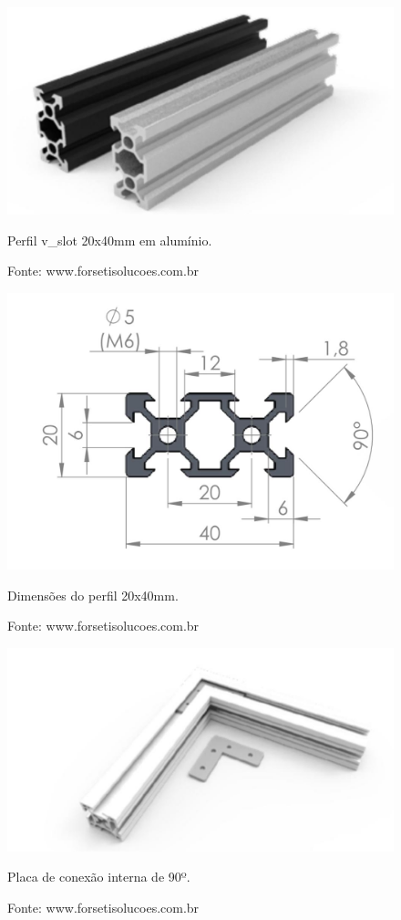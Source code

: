 \begin{figure}[!htb]
\centering
\includegraphics[scale = 0.4]{figuras/3-1}
\caption{Perfil v\_slot  20x40mm em alumínio.}
\caption*{Fonte: www.forsetisolucoes.com.br}
\label{figp20x40p}
\end{figure}
    
\begin{figure}[!htb]
\centering
\includegraphics[scale = 0.4]{figuras/3-2}
\caption{Dimensões do perfil 20x40mm.}
\caption*{Fonte: www.forsetisolucoes.com.br}
\label{figp20x40d}
\end{figure}
    
\begin{figure}[!htb]
\centering
\includegraphics[scale = 0.4]{figuras/3-3}
\caption{Placa de conexão interna de 90º.}
\caption*{Fonte: www.forsetisolucoes.com.br}
\label{figpconexao90p}
\end{figure}
    
